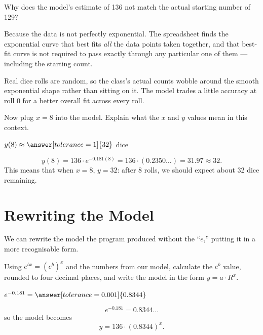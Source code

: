 \documentclass[12pt]{ximera}
\begin{document}
\begin{problem}
Why does the model's estimate of 136 not match the actual starting number of 129?

\begin{freeResponse}
\end{freeResponse}

\begin{solution}
Because the data is not perfectly exponential. The spreadsheet finds the exponential
curve that best fits \emph{all} the data points taken together, and that best-fit curve is
not required to pass exactly through any particular one of them --- including the starting
count.

Real dice rolls are random, so the class's actual counts wobble around the smooth
exponential shape rather than sitting on it. The model trades a little accuracy at roll 0
for a better overall fit across every roll.
\end{solution}
\end{problem}

\begin{problem}
Now plug $x = 8$ into the model. Explain what the $x$ and $y$ values mean in this context.

$y(8) \approx \answer[tolerance=1]{32}$ dice

\begin{freeResponse}
\end{freeResponse}

\begin{solution}
\[
y(8) = 136 \cdot e^{-0.181(8)} = 136 \cdot (0.2350\ldots) = 31.97 \approx 32.
\]
This means that when $x = 8$, $y = 32$: after 8 rolls, we should expect about 32 dice
remaining.
\end{solution}
\end{problem}

\section*{Rewriting the Model}

We can rewrite the model the program produced without the ``$e$,'' putting it in a more
recognisable form.

\begin{problem}
Using $e^{bx} = (e^b)^x$ and the numbers from our model, calculate the $e^b$ value,
rounded to four decimal places, and write the model in the form $y = a \cdot R^x$.

$e^{-0.181} = \answer[tolerance=0.001]{0.8344}$

\begin{freeResponse}
\end{freeResponse}

\begin{solution}
\[
e^{-0.181} = 0.8344\ldots
\]
so the model becomes
\[
y = 136 \cdot (0.8344)^x.
\]
\end{solution}
\end{problem}
\end{document}
